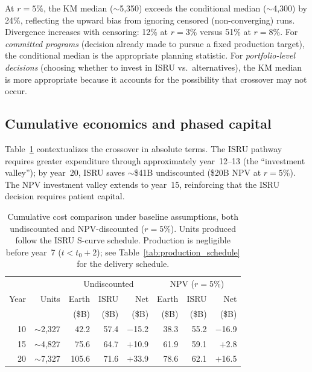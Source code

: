 \documentclass[preprint,12pt]{elsarticle}
\begin{document}
At $r = 5\%$, the KM median ($\sim$5{,}350) exceeds the conditional median ($\sim$4{,}300) by 24\%, reflecting the upward bias from ignoring censored (non-converging) runs. Divergence increases with censoring: 12\% at $r = 3\%$ versus 51\% at $r = 8\%$. For \emph{committed programs} (decision already made to pursue a fixed production target), the conditional median is the appropriate planning statistic. For \emph{portfolio-level decisions} (choosing whether to invest in ISRU vs.\ alternatives), the KM median is more appropriate because it accounts for the possibility that crossover may not occur.

\subsection{Cumulative economics and phased capital}
\label{sec:phased_capital}

Table~\ref{tab:cumulative} contextualizes the crossover in absolute terms. The ISRU pathway requires greater expenditure through approximately year~12--13 (the ``investment valley''); by year~20, ISRU saves $\sim$\$41B undiscounted (\$20B NPV at $r = 5\%$). The NPV investment valley extends to year~15, reinforcing that the ISRU decision requires patient capital.

\begin{table}[htbp]
\centering
\caption{Cumulative cost comparison under baseline assumptions, both undiscounted and NPV-discounted ($r = 5\%$). Units produced follow the ISRU S-curve schedule. Production is negligible before year~7 ($t < t_0 + 2$); see Table~\ref{tab:production_schedule} for the delivery schedule.}
\label{tab:cumulative}
\begin{tabular}{@{}rr|rrr|rrr@{}}
\toprule
 & & \multicolumn{3}{c|}{Undiscounted} & \multicolumn{3}{c}{NPV ($r = 5\%$)} \\
Year & Units & Earth & ISRU & Net & Earth & ISRU & Net \\
 & & (\$B) & (\$B) & (\$B) & (\$B) & (\$B) & (\$B) \\
\midrule
10 & $\sim$2{,}327 & 42.2  & 57.4   & $-$15.2 & 38.3  & 55.2  & $-$16.9 \\
15 & $\sim$4{,}827 & 75.6  & 64.7   & $+$10.9 & 61.9  & 59.1  & $+$2.8  \\
20 & $\sim$7{,}327 & 105.6 & 71.6   & $+$33.9 & 78.6  & 62.1  & $+$16.5 \\
\bottomrule
\end{tabular}
\end{table}
\end{document}
